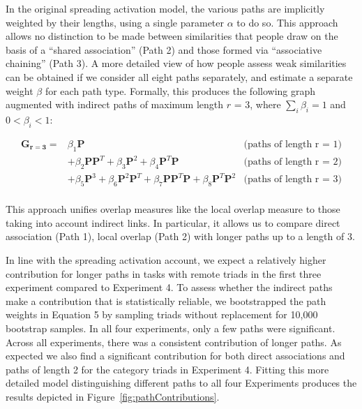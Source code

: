 \documentclass[doc]{apa6}
\begin{document}
In the original spreading activation model, the various paths are implicitly weighted by their lengths, using a single parameter $\alpha$ to do so. This approach allows no distinction to be made between similarities that people draw on the basis of a ``shared association'' (Path 2) and those formed via ``associative chaining'' (Path 3). A more detailed view of how people assess weak similarities can be obtained if we consider all eight paths separately, and estimate a separate weight $\beta$ for each path type. Formally, this produces the following graph augmented with indirect paths of maximum length $r$ = 3, where  $\sum_i \beta_i = 1$  and  $0 < \beta_i < 1$:


\begin{equation}
\begin{array}{llr}
 \mathbf{G_{r=3}}
  = & \beta_1\mathbf{P} & \text{(paths of length r = 1)}\\
    & + \beta_2\mathbf{P}\mathbf{P}^T + \beta_3\mathbf{P}^2   + \beta_4\mathbf{P}^T\mathbf{P} & \text{(paths of length r = 2)}\\
    & + \beta_5\mathbf{P}^3 + \beta_6\mathbf{P}^2\mathbf{P}^T + \beta_7\mathbf{P}\mathbf{P}^T\mathbf{P} + \beta_8\mathbf{P}^T\mathbf{P}^2  & \text{(paths of length r = 3)}\\
\end{array}
\label{equation_sww}
\end{equation}


This approach unifies overlap measures like the local overlap measure to those taking into account indirect links. In particular, it allows us to compare direct association (Path 1), local overlap (Path 2) with longer paths up to a length of 3.

In line with the spreading activation account, we expect a relatively higher contribution for longer paths in tasks with remote triads in the first three experiment compared to Experiment 4.
To assess whether the indirect paths make a contribution that is statistically reliable, we bootstrapped the path weights in Equation 5 by sampling triads without replacement for 10,000 bootstrap samples. In all four experiments, only a few paths were significant. Across all experiments, there was a consistent contribution of longer paths. As expected we also find a significant contribution for both direct associations and paths of length 2 for the category triads in Experiment 4.
Fitting this more detailed model distinguishing different paths to all four Experiments produces the results depicted in Figure~\ref{fig:pathContributions}.
\end{document}
